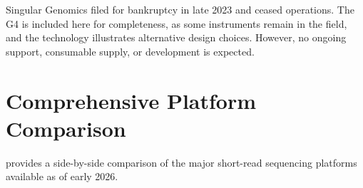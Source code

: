 \begin{warningbox}[title={Singular Genomics Status}]
Singular Genomics filed for bankruptcy in late 2023 and ceased operations. The G4 is included here for completeness, as some instruments remain in the field, and the technology illustrates alternative design choices. However, no ongoing support, consumable supply, or development is expected.
\end{warningbox}


\section{Comprehensive Platform Comparison}
\label{sec:shortread_comparison}

 provides a side-by-side comparison of the major short-read sequencing platforms available as of early 2026.

